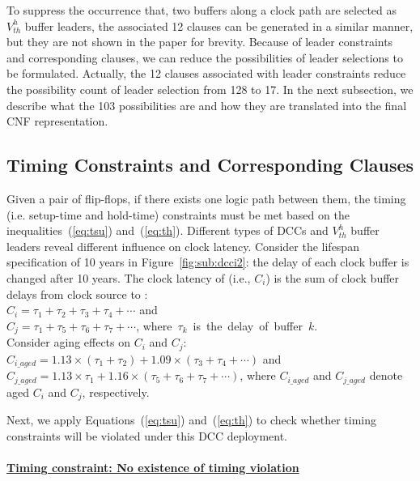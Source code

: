 To suppress the occurrence that, two buffers along a clock path are selected as $V_{th}^h$ buffer leaders, the associated 12 clauses can be generated in a similar manner, but they are not shown in the paper for brevity. Because of leader constraints and corresponding clauses, we can reduce the possibilities of leader selections to be formulated. Actually, the 12 clauses associated with leader constraints reduce the possibility count of leader selection from 128 to 17. In the next subsection, we describe what the 103 possibilities are and how they are translated into the final CNF representation.

\subsection{Timing Constraints and Corresponding Clauses}
\label{subsec:tccc}
Given a pair of flip-flops, if there exists one logic path between them, the timing (i.e. setup-time and hold-time) constraints must be met based on the inequalities~(\ref{eq:tsu}) and~(\ref{eq:th}). Different types of DCCs and $V_{th}^h$ buffer leaders reveal different influence on clock latency. Consider the lifespan specification of 10 years in Figure~\ref{fig:sub:dcci2}: the delay of each clock buffer is changed after 10 years. The clock latency of  (i.e., $C_i$) is the sum of clock buffer delays from clock source to : \\
$C_i = \tau_1 + \tau_2 + \tau_3 + \tau_4 +\dotsb$ and \\
$C_j = \tau_1 + \tau_5 + \tau_6 + \tau_7 +\dotsb$, \mbox{\fontsize{9}{10.8}\selectfont where $\tau_k$ is the delay of buffer $k$.}\\
Consider aging effects on $C_i$ and $C_j$: \\
$C_{i\_aged} = 1.13 \times \left(\tau_1 + \tau_2\right) + 1.09 \times \left(\tau_3 + \tau_4 + \dotsb\right)$ and \\
$C_{j\_aged} = 1.13 \times \tau_1+ 1.16 \times \left( \tau_5 + \tau_6 + \tau_7 + \dotsb \right)$, where $C_{i\_aged}$ and $C_{j\_aged}$ denote aged $C_i$ and $C_j$, respectively.

Next, we apply Equations~(\ref{eq:tsu}) and~(\ref{eq:th}) to check whether timing constraints will be violated under this DCC deployment.\\ \\
\textbf{\uline{Timing constraint: No existence of timing violation}}

